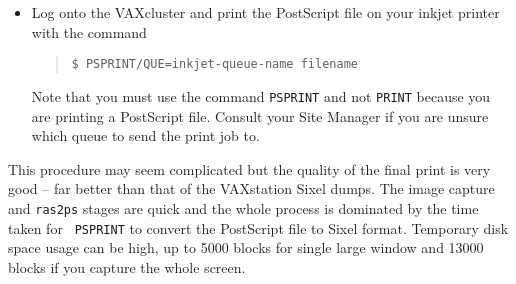 \begin{itemize}
\item Log onto the VAXcluster and print the PostScript file on your inkjet
printer with the command

\begin{quote}

    {\tt \$ PSPRINT/QUE=inkjet-queue-name filename}

\end{quote}

Note that you must use the command {\tt PSPRINT} and not {\tt PRINT} because
you are printing a PostScript file. Consult your Site Manager if you are unsure
which queue to send the print job to.


\end{itemize}

This procedure may seem complicated but the quality of the final print is very
good -- far better than that of the VAXstation Sixel dumps.
The image capture and {\tt ras2ps} stages
are quick and the whole process is dominated by the time taken for {\tt
PSPRINT} to convert the PostScript file to Sixel format. Temporary disk space
usage can be high, up to 5000 blocks for single large window and 13000 blocks
if you capture the whole screen.


